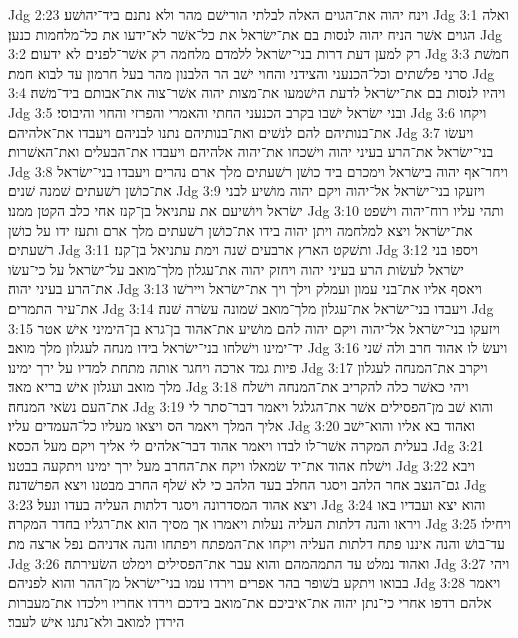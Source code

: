 Jdg 2:23  וינח יהוה את־הגוים האלה לבלתי הורישׁם מהר ולא נתנם ביד־יהושׁע׃
Jdg 3:1  ואלה הגוים אשׁר הניח יהוה לנסות בם את־ישׂראל את כל־אשׁר לא־ידעו את כל־מלחמות כנען׃
Jdg 3:2  רק למען דעת דרות בני־ישׂראל ללמדם מלחמה רק אשׁר־לפנים לא ידעום׃
Jdg 3:3  חמשׁת סרני פלשׁתים וכל־הכנעני והצידני והחוי ישׁב הר הלבנון מהר בעל חרמון עד לבוא חמת׃
Jdg 3:4  ויהיו לנסות בם את־ישׂראל לדעת הישׁמעו את־מצות יהוה אשׁר־צוה את־אבותם ביד־משׁה׃
Jdg 3:5  ובני ישׂראל ישׁבו בקרב הכנעני החתי והאמרי והפרזי והחוי והיבוסי׃
Jdg 3:6  ויקחו את־בנותיהם להם לנשׁים ואת־בנותיהם נתנו לבניהם ויעבדו את־אלהיהם׃
Jdg 3:7  ויעשׂו בני־ישׂראל את־הרע בעיני יהוה וישׁכחו את־יהוה אלהיהם ויעבדו את־הבעלים ואת־האשׁרות׃
Jdg 3:8  ויחר־אף יהוה בישׂראל וימכרם ביד כושׁן רשׁעתים מלך ארם נהרים ויעבדו בני־ישׂראל את־כושׁן רשׁעתים שׁמנה שׁנים׃
Jdg 3:9  ויזעקו בני־ישׂראל אל־יהוה ויקם יהוה מושׁיע לבני ישׂראל ויושׁיעם את עתניאל בן־קנז אחי כלב הקטן ממנו׃
Jdg 3:10  ותהי עליו רוח־יהוה וישׁפט את־ישׂראל ויצא למלחמה ויתן יהוה בידו את־כושׁן רשׁעתים מלך ארם ותעז ידו על כושׁן רשׁעתים׃
Jdg 3:11  ותשׁקט הארץ ארבעים שׁנה וימת עתניאל בן־קנז׃
Jdg 3:12  ויספו בני ישׂראל לעשׂות הרע בעיני יהוה ויחזק יהוה את־עגלון מלך־מואב על־ישׂראל על כי־עשׂו את־הרע בעיני יהוה׃
Jdg 3:13  ויאסף אליו את־בני עמון ועמלק וילך ויך את־ישׂראל ויירשׁו את־עיר התמרים׃
Jdg 3:14  ויעבדו בני־ישׂראל את־עגלון מלך־מואב שׁמונה עשׂרה שׁנה׃
Jdg 3:15  ויזעקו בני־ישׂראל אל־יהוה ויקם יהוה להם מושׁיע את־אהוד בן־גרא בן־הימיני אישׁ אטר יד־ימינו וישׁלחו בני־ישׂראל בידו מנחה לעגלון מלך מואב׃
Jdg 3:16  ויעשׂ לו אהוד חרב ולה שׁני פיות גמד ארכה ויחגר אותה מתחת למדיו על ירך ימינו׃
Jdg 3:17  ויקרב את־המנחה לעגלון מלך מואב ועגלון אישׁ בריא מאד׃
Jdg 3:18  ויהי כאשׁר כלה להקריב את־המנחה וישׁלח את־העם נשׂאי המנחה׃
Jdg 3:19  והוא שׁב מן־הפסילים אשׁר את־הגלגל ויאמר דבר־סתר לי אליך המלך ויאמר הס ויצאו מעליו כל־העמדים עליו׃
Jdg 3:20  ואהוד בא אליו והוא־ישׁב בעלית המקרה אשׁר־לו לבדו ויאמר אהוד דבר־אלהים לי אליך ויקם מעל הכסא׃
Jdg 3:21  וישׁלח אהוד את־יד שׂמאלו ויקח את־החרב מעל ירך ימינו ויתקעה בבטנו׃
Jdg 3:22  ויבא גם־הנצב אחר הלהב ויסגר החלב בעד הלהב כי לא שׁלף החרב מבטנו ויצא הפרשׁדנה׃
Jdg 3:23  ויצא אהוד המסדרונה ויסגר דלתות העליה בעדו ונעל׃
Jdg 3:24  והוא יצא ועבדיו באו ויראו והנה דלתות העליה נעלות ויאמרו אך מסיך הוא את־רגליו בחדר המקרה׃
Jdg 3:25  ויחילו עד־בושׁ והנה איננו פתח דלתות העליה ויקחו את־המפתח ויפתחו והנה אדניהם נפל ארצה מת׃
Jdg 3:26  ואהוד נמלט עד התמהמהם והוא עבר את־הפסילים וימלט השׂעירתה׃
Jdg 3:27  ויהי בבואו ויתקע בשׁופר בהר אפרים וירדו עמו בני־ישׂראל מן־ההר והוא לפניהם׃
Jdg 3:28  ויאמר אלהם רדפו אחרי כי־נתן יהוה את־איביכם את־מואב בידכם וירדו אחריו וילכדו את־מעברות הירדן למואב ולא־נתנו אישׁ לעבר׃
